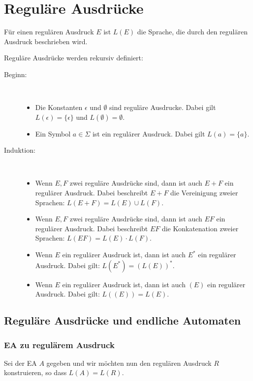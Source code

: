 \section{Reguläre Ausdrücke}
\begin{definition}
Für einen regulären Ausdruck \(E\) ist \(L(E)\) die Sprache, die durch den regulären Ausdruck beschrieben wird.\\
\end{definition}

\begin{definition}
Reguläre Ausdrücke werden rekursiv definiert:
\begin{description}
  \item[Beginn:]\ 
  \begin{itemize}
    \item Die Konstanten \(\epsilon\) und \(\emptyset\) sind reguläre Ausdrucke. Dabei gilt \(L(\epsilon) = \{\epsilon\}\) und \(L(\emptyset) = \emptyset\).
    \item Ein Symbol \(a \in \Sigma\) ist ein regulärer Ausdruck. Dabei gilt \(L(a) = \{a\}\).
  \end{itemize}
  
  \item[Induktion:]\ 
  \begin{itemize}
    \item Wenn \(E, F\) zwei reguläre Ausdrücke sind, dann ist auch \(E + F\) ein regulärer Ausdruck. Dabei beschreibt \(E + F\) die Vereinigung zweier Sprachen: \(L(E + F) = L(E) \cup L(F)\).
    \item Wenn \(E, F\) zwei reguläre Ausdrücke sind, dann ist auch \(EF\) ein regulärer Ausdruck. Dabei beschreibt \(EF\) die Konkatenation zweier Sprachen: \(L(EF) = L(E) \cdot L(F)\).
    \item Wenn \(E\) ein regulärer Ausdruck ist, dann ist auch \(E^*\) ein regulärer Ausdruck. Dabei gilt: \(L(E^*) = (L(E))^*\).
    \item Wenn \(E\) ein regulärer Ausdruck ist, dann ist auch \((E)\) ein regulärer Ausdruck. Dabei gilt: \(L((E)) = L(E)\).\\
  \end{itemize}
\end{description}
\end{definition}

\subsection{Reguläre Ausdrücke und endliche Automaten}
\subsubsection{EA zu regulärem Ausdruck}
Sei der EA \(A\) gegeben und wir möchten nun den regulären Ausdruck \(R\) konstruieren, so dass \(L(A) = L(R)\).

